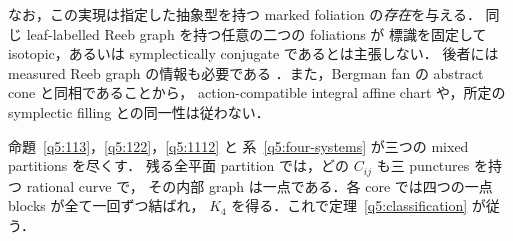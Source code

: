 なお，この実現は指定した抽象型を持つ marked foliation の\emph{存在}を与える．
同じ leaf-labelled Reeb graph を持つ任意の二つの foliations が
標識を固定して isotopic，あるいは symplectically conjugate であるとは主張しない．
後者には measured Reeb graph の情報も必要である
\cite{DMT,IKM}．また，Bergman fan の abstract cone と同相であることから，
action-compatible integral affine chart や，所定の symplectic filling との同一性は従わない．

命題~\ref{q5:113}，\ref{q5:122}，\ref{q5:1112} と
系~\ref{q5:four-systems} が三つの mixed partitions を尽くす．
残る全平面 partition では，どの $C_{ij}$ も三 punctures を持つ rational curve で，
その内部 graph は一点である．各 core では四つの一点 blocks が全て一回ずつ結ばれ，
$K_4$ を得る．これで定理~\ref{q5:classification} が従う．

